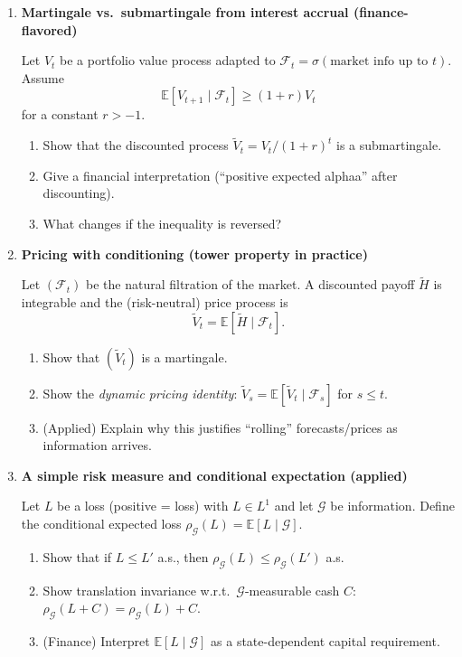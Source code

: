 \documentclass[11pt]{article}
\begin{document}
\begin{enumerate}
\bigskip

\item \textbf{Martingale vs.\ submartingale from interest accrual (finance-flavored)}

Let $V_t$ be a portfolio value process adapted to $\mathcal{F}_t=\sigma(\text{market info up to }t)$.
Assume
\[
\mathbb{E}[V_{t+1}\mid \mathcal{F}_t]\ge (1+r)V_t
\]
for a constant $r>-1$.
\begin{enumerate}
\item Show that the discounted process $\tilde V_t=V_t/(1+r)^t$ is a submartingale.
\item Give a financial interpretation (``positive expected alphaa'' after discounting).
\item What changes if the inequality is reversed?
\end{enumerate}

\bigskip

\item \textbf{Pricing with conditioning (tower property in practice)}

Let $(\mathcal{F}_t)$ be the natural filtration of the market.
A discounted payoff $\tilde H$ is integrable and the (risk-neutral) price process is
\[
\tilde V_t=\mathbb{E}[\tilde H\mid \mathcal{F}_t].
\]
\begin{enumerate}
\item Show that $(\tilde V_t)$ is a martingale.
\item Show the \emph{dynamic pricing identity}:
$\tilde V_s=\mathbb{E}[\tilde V_t\mid \mathcal{F}_s]$ for $s\le t$.
\item (Applied) Explain why this justifies ``rolling'' forecasts/prices as information arrives.
\end{enumerate}

\bigskip

\item \textbf{A simple risk measure and conditional expectation (applied)}

Let $L$ be a loss (positive = loss) with $L\in L^1$ and let $\mathcal{G}$ be information.
Define the conditional expected loss $\rho_\mathcal{G}(L)=\mathbb{E}[L\mid \mathcal{G}]$.
\begin{enumerate}
\item Show that if $L\le L'$ a.s., then $\rho_\mathcal{G}(L)\le \rho_\mathcal{G}(L')$ a.s.
\item Show translation invariance w.r.t.\ $\mathcal{G}$-measurable cash $C$:
$\rho_\mathcal{G}(L+C)=\rho_\mathcal{G}(L)+C$.
\item (Finance) Interpret $\mathbb{E}[L\mid \mathcal{G}]$ as a state-dependent capital requirement.
\end{enumerate}


\end{enumerate}
\end{document}
